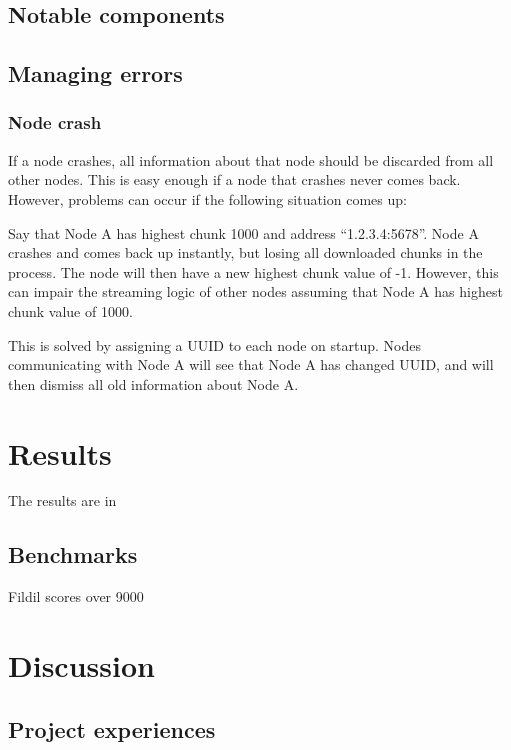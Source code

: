 \documentclass[10pt, a4paper]{article}
\begin{document}
\subsection{Notable components}


\subsection{Managing errors}

\subsubsection{Node crash}

If a node crashes, all information about that node should be discarded from all
other nodes. This is easy enough if a node that crashes never comes
back. However, problems can occur if the following situation comes up:

Say that Node A has highest chunk 1000 and address ``1.2.3.4:5678''. Node A
crashes and comes back up instantly, but losing all downloaded chunks in the
process. The node will then have a new highest chunk value of -1. However, this
can impair the streaming logic of other nodes assuming that Node A has highest
chunk value of 1000.

This is solved by assigning a UUID to each node on startup. Nodes communicating
with Node A will see that Node A has changed UUID, and will then dismiss all old
information about Node A.

\section{Results}
\label{sec:results}

The results are in

\subsection{Benchmarks}

Fildil scores over 9000

\section{Discussion}
\label{sec:discussion}

\subsection{Project experiences}
\end{document}
